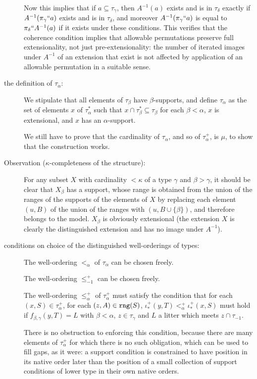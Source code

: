 \documentclass[112pt]{article}
\begin{document}
\begin{description}
Now this implies that if $a \subseteq \tau_\gamma$, then $A^{-1}(a)$ exists and is in $\tau_\delta$ exactly if $A^{-1}(\pi_\gamma``a)$ exists and is in $\tau_\delta$, and moreover $A^{-1}(\pi_\gamma``a)$ is equal to $\pi_\delta``A^{-1}(a)$ if it exists under these conditions.  This verifies that the coherence condition implies that allowable permutations preserve full extensionality, not just pre-extensionality:  the number of iterated images under $A^{-1}$ of an extension that exist is not affected by application of an allowable permutation in a suitable sense.



\item[the definition of $\tau_\alpha$:]  We stipulate that all elements of $\tau_\beta$ have $\beta$-supports, and define $\tau_\alpha$ as the set of elements $x$ of $\tau^*_\alpha$ such that
$x \cap \tau^*_{\beta} \subseteq \tau_\beta$ for each $\beta<\alpha$, $x$ is extensional, and $x$ has an $\alpha$-support.

We still have to prove that the cardinality of $\tau_\alpha$, and so of $\tau^+_\alpha$, is $\mu$, to show that the construction works.

\item[Observation ($\kappa$-completeness of the structure):]  For any subset $X$ with cardinality $<\kappa$ of a type $\gamma$ and $\beta>\gamma$, it should be clear that $X_\beta$ has a support, whose range is obtained from the union of the ranges of the supports of the elements of $X$  by replacing each element $(u,B)$ of the union of the ranges  with $(u,B \cup \{\beta\})$, and therefore belongs to the model.  $X_\beta$ is obviously extensional (the extension $X$ is clearly the distinguished extension and has no image under $A^{-1}$).

\item[conditions on choice of the distinguished well-orderings of types:]   The well-ordering $<_\alpha$ of $\tau_\alpha$ can be chosen freely.

The well-ordering $\leq_{-1}^+$ can be chosen freely.

The well-ordering $\leq_\alpha^+$ of $\tau_\alpha^+$ must satisfy the condition that for each $(x,S) \in \tau_\alpha^+$, for each $(z,A) \in {\tt rng}(S)$, $\iota_*^+(y,T) <_\alpha^+ \iota_*^+(x,S)$ must hold if $f_{\beta,\gamma}(y,T) = L$  with $\beta<\alpha$, $z \in \tau_\gamma$ and
$L$ a litter which meets $z \cap \tau_{-1}$. 

There is no obstruction to enforcing this condition, because there are many elements of $\tau_{\alpha}^+$ for which there is no such obligation, which can be used to fill gaps, as it were: a support condition is constrained to have position in its native order later than the position of a small collection of support conditions of lower type in their own native orders.


\end{description}
\end{document}

